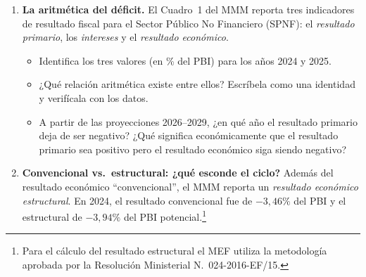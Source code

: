 
        \begin{enumerate}[label = (\alph*), start=3]   %

            \item \textbf{La aritmética del déficit.}
            El Cuadro~1 del MMM reporta tres indicadores de resultado fiscal
            para el Sector Público No Financiero (SPNF):
            el \emph{resultado primario}, los \emph{intereses} y el
            \emph{resultado económico}.

            \begin{itemize}
                \item Identifica los tres valores (en \% del PBI) para
                      los años 2024 y 2025.
                \item ¿Qué relación aritmética existe entre ellos?
                      Escríbela como una identidad y verifícala con
                      los datos.
                \item A partir de las proyecciones 2026--2029, ¿en qué
                      año el resultado primario deja de ser negativo?
                      ¿Qué significa económicamente que el resultado
                      primario sea positivo pero el resultado económico
                      siga siendo negativo?
            \end{itemize}

            \item \textbf{Convencional vs.\ estructural: ¿qué esconde
                  el ciclo?}
            Además del resultado económico ``convencional'', el MMM
            reporta un \emph{resultado económico estructural}.
            En 2024, el resultado convencional fue de
            $-3{,}46\%$ del PBI y el estructural de
            $-3{,}94\%$ del PBI potencial.\footnote{Para el cálculo
            del resultado estructural el MEF utiliza la metodología
            aprobada por la Resolución Ministerial N.\textordmasculine~024-2016-EF/15.}


\end{enumerate}
